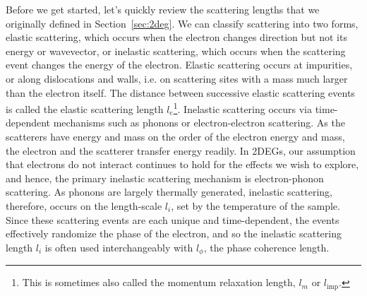 Before we get started, let's quickly review the scattering lengths that we originally defined in Section~\ref{sec:2deg}. We can classify
scattering into two forms, elastic scattering, which occurs when the electron changes direction but not its energy or wavevector, or
inelastic scattering, which occurs when the scattering event changes the energy of the electron. Elastic scattering occurs at impurities, or along dislocations
and walls, i.e. on scattering sites with a mass much larger than the electron itself. The distance between successive elastic scattering events is
called the elastic scattering length $l_e$\footnote{This is sometimes also called the momentum relaxation length, $l_m$ or $l_{\textrm{imp}}$.}.
Inelastic scattering occurs via time-dependent mechanisms such as phonons or electron-electron scattering. As the scatterers have energy and
mass on the order of the electron energy and mass, the electron and the scatterer transfer energy readily. In 2DEGs, our assumption that
electrons do not interact continues to hold for the effects we wish to explore, and hence, the primary inelastic scattering mechanism is electron-phonon scattering.
As phonons are largely thermally generated, inelastic scattering, therefore, occurs on the length-scale $l_i$, set by the temperature of the sample. Since these scattering events
are each unique and time-dependent, the events effectively randomize the phase of the electron, and so
the inelastic scattering length $l_i$ is often used interchangeably with $l_\phi$, the phase coherence length.

